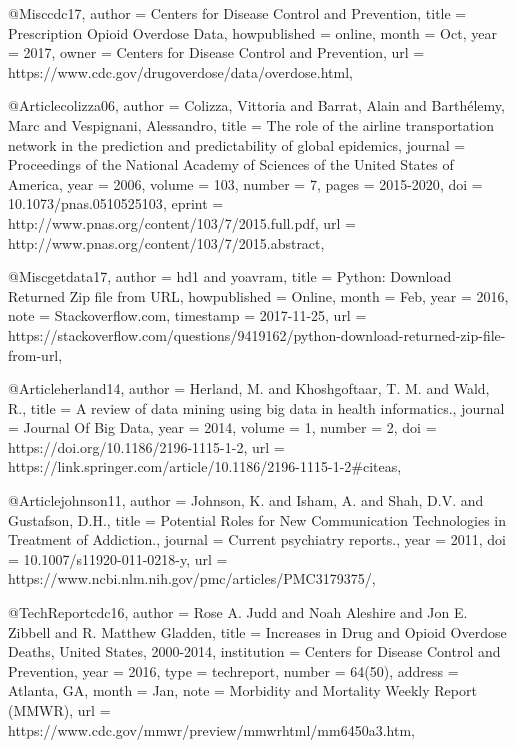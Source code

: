 
@Misc{cdc17,
  author       = {Centers for Disease Control and Prevention},
  title        = {Prescription Opioid Overdose Data},
  howpublished = {online},
  month        = Oct,
  year         = {2017},
  owner        = {Centers for Disease Control and Prevention},
  url          = {https://www.cdc.gov/drugoverdose/data/overdose.html},
}

@Article{colizza06,
  author  = {Colizza, Vittoria and Barrat, Alain and Barthélemy, Marc and Vespignani, Alessandro},
  title   = {The role of the airline transportation network in the prediction and predictability of global epidemics},
  journal = {Proceedings of the National Academy of Sciences of the United States of America},
  year    = {2006},
  volume  = {103},
  number  = {7},
  pages   = {2015-2020},
  doi     = {10.1073/pnas.0510525103},
  eprint  = {http://www.pnas.org/content/103/7/2015.full.pdf},
  url     = {http://www.pnas.org/content/103/7/2015.abstract},
}



@Misc{getdata17,
  author       = {hd1 and yoavram},
  title        = {Python: Download Returned Zip file from URL},
  howpublished = {Online},
  month        = Feb,
  year         = {2016},
  note         = {Stackoverflow.com},
  timestamp    = {2017-11-25},
  url          = {https://stackoverflow.com/questions/9419162/python-download-returned-zip-file-from-url},
}

@Article{herland14,
  author  = {Herland, M. and Khoshgoftaar, T. M. and Wald, R.},
  title   = {A review of data mining using big data in health informatics.},
  journal = {Journal Of Big Data},
  year    = {2014},
  volume  = {1},
  number  = {2},
  doi     = {https://doi.org/10.1186/2196-1115-1-2},
  url     = {https://link.springer.com/article/10.1186/2196-1115-1-2#citeas},
}


@Article{johnson11,
  author  = {Johnson, K. and Isham, A. and Shah, D.V. and Gustafson, D.H.},
  title   = {Potential Roles for New Communication Technologies in Treatment of Addiction.},
  journal = {Current psychiatry reports.},
  year    = {2011},
  doi     = {10.1007/s11920-011-0218-y},
  url     = {https://www.ncbi.nlm.nih.gov/pmc/articles/PMC3179375/},
}

@TechReport{cdc16,
  author      = {Rose A. Judd and Noah Aleshire and Jon E. Zibbell and R. Matthew Gladden},
  title       = {Increases in Drug and Opioid Overdose Deaths, United States, 2000-2014},
  institution = {Centers for Disease Control and Prevention},
  year        = {2016},
  type        = {techreport},
  number      = {64(50)},
  address     = {Atlanta, GA},
  month       = Jan,
  note        = {Morbidity and Mortality Weekly Report (MMWR)},
  url         = {https://www.cdc.gov/mmwr/preview/mmwrhtml/mm6450a3.htm},
}


